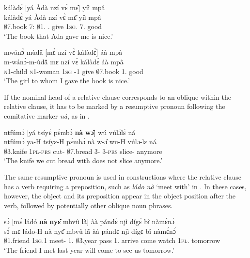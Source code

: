 \ea \label{SREL4} 
  \glll kálàdɛ̀ [yá Àdà nzí vɛ̀ mɛ̂]\textsubscript{{\REL}} yíì mpâ \\
         kálàdɛ̀ {\db}yá Àdà nzí vɛ̀ mɛ̂ yíì mpâ \\
        $\emptyset$7.book {\db}7:{\ATT} $\emptyset$1.{\PN} {\PROG}.{\PST} give 1\textsc{sg}.{\OBJ} 7.{\COP} good \\
    \trans `The book that Ada gave me is nice.'
\z


\ea \label{SREL5} 
  \glll mwánɔ̀-mùdã̂ [mɛ̀ nzí vɛ̀ kálàdɛ̀]\textsubscript{{\REL}} áà mpâ \\
         m-wánɔ̀-m-ùdã̂ {\db}mɛ nzí vɛ̀ kálàdɛ̀ áà mpâ \\
         \textsc{n}1-child \textsc{n}1-woman {\db}1\textsc{sg} {\PROG}-{\PST}1 give $\emptyset$7.book 1.{\COP} good \\
    \trans `The girl to whom I gave the book is nice.'
\z


If the nominal head of a relative clause corresponds to an oblique within the relative clause, it has to be marked by a resumptive pronoun following the comitative marker {\itshape nà}, as in .


\ea \label{SREL6} 
  \glll ntfúmɔ̀ [yá tsíyɛ́ pɛ́mbɔ́ {\bfseries nà} {\bfseries wɔ̂}]\textsubscript{{\REL}} wú vúlɔ́lɛ́ ná \\
         ntfúmɔ̀ {\db}ya-H tsíyɛ-H pɛ́mbɔ́ nà w-ɔ̂ wu-H vúlɔ-lɛ ná \\
         $\emptyset$3.knife {\db}1\textsc{pl}-\textsc{prs} cut-{\R} $\emptyset$7.bread {\COM} 3-{\OBJ} 3-\textsc{prs} slice-{\NEG} anymore\\
    \trans `The knife we cut bread with does not slice anymore.'
\z

\noindent The same resumptive pronoun is used in constructions where the relative clause has a verb requiring a preposition, such as {\itshape ládo nà} `meet with' in . In these cases, however, the object and its preposition appear in the object position after the verb, followed by potentially other oblique noun phrases.


\ea \label{SREL7} 
  \glll sɔ́ [mɛ̀ ládó {\bfseries nà} {\bfseries nyɛ̂} mbvû lã̀]\textsubscript{{\REL}} àà pándɛ̀ njì dígɛ̀ bî nàmɛ́nɔ́ \\
         sɔ́ {\db}mɛ ládo-H nà nyɛ̂ mbvû lã̀ àà pándɛ njì dígɛ bî nàmɛ́nɔ́ \\
         $\emptyset$1.friend {\db}1\textsc{sg}.{\PST}1 meet-{\R} {\COM} 1.{\OBJ} $\emptyset$3.year pass 1.{\FUT} arrive come watch 1\textsc{pl}.{\OBJ} tomorrow \\
    \trans `The friend I met last year will come to see us tomorrow.'
\z

